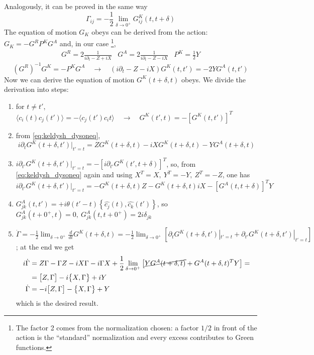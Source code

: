\documentclass[a4paper,11pt]{article}
\theoremstyle{remark}
\newcommand{\mean}[1]{\ensuremath{\langle #1 \rangle}}
\newcommand{\ra}{\rightarrow}
\newcommand{\nl}{\vskip 0.3cm}
\begin{document}
  Analogously, it can be proved in the same way
  \begin{equation*}
   \Gamma_{ij}=-\frac{1}{2}\lim_{\delta\to0^+}G^K_{ij}(t,t+\delta)
  \end{equation*}
  \nl
  The equation of motion $G_K$ obeys can be derived from the action: $G_K=-G^RP^KG^A$ and, in our case \footnote{The factor 2 comes from the normalization chosen: a factor $1/2$ in front of the action is the ``standard'' normalization and every excess contributes to Green functions. },
  \begin{equation*}
   \begin{array}{ccc}
    G^R=2\frac{1}{i\partial_t-Z+iX} & G^A=2\frac{1}{i\partial_t-Z-iX} & P^K=\frac{1}{2}Y
   \end{array}
   \end{equation*}
  \begin{equation}
   (G^R)^{-1}G^K = -P^KG^A \quad\ra\quad (i\partial_t -Z -iX)G^K(t,t')=-2YG^A(t,t') \label{eq:keldysh_dysoneq}
  \end{equation}
  Now we can derive the equation of motion $G^K(t+\delta,t)$ obeys. We divide the derivation into steps: 
  \begin{enumerate}
   \item for $t\neq t'$, $\mean{c_i(t)c_j(t')}=-\mean{c_j(t')c_i{t}} \quad \ra \quad G^K(t',t)=-[G^K(t,t')]^T$
   \item from \eqref{eq:keldysh_dysoneq}, $$\displaystyle i\partial_tG^K(t+\delta,t')|_{t'=t} = ZG^K(t+\delta,t) -iXG^K(t+\delta,t)-YG^A(t+\delta,t)$$
   \item $\displaystyle i\partial_{t'}G^K(t+\delta,t')|_{t'=t} = -\left[i\partial_{t'}G^K(t',t+\delta)\right]^T$, so, from \eqref{eq:keldysh_dysoneq} again and using $\displaystyle X^T=X,\ Y^T=-Y,\ Z^T=-Z$, one has $$\displaystyle i\partial_{t'}G^K(t+\delta,t')|_{t'=t} = - G^K(t+\delta,t)Z - G^K(t+\delta,t)iX-\left[G^A(t,t+\delta)\right]^TY$$
   \item $\displaystyle G^A_{jk}(t,t')=+i\theta(t'-t)\left\{\hat{c_j}(t),\hat{c_k}(t')\right\}$, so $\displaystyle G^A_{jk}(t+0^+,t)=0,\ G^A_{jk}(t,t+0^+)=2i\delta_{jk}$
   \item $\displaystyle\dot{\Gamma}=-\frac{1}{2}\lim_{\delta\to0^+}\frac{d}{dt}G^K(t+\delta,t)=-\frac{1}{2}\lim_{\delta\to0^+}\left[\partial_tG^K(t+\delta,t')|_{t'=t}+\partial_{t'}G^K(t+\delta,t')|_{t'=t}\right]$; at the end we get
   \begin{align*}
    i\dot{\Gamma} &= Z\Gamma - \Gamma Z - iX\Gamma -i\Gamma X +\frac{1}{2}\lim_{\delta\to 0^+}\left[\cancel{YG^A(t+\delta,t)}+ G^A(t+\delta,t)^TY\right] = \\
    &= \big[Z,\Gamma\big] -i\big\{X,\Gamma\big\} +iY \\
    \dot{\Gamma} &= -i\big[Z,\Gamma\big] -\big\{X,\Gamma\big\} +Y
   \end{align*}
   which is the desired result.
  \end{enumerate}
 \pagebreak
\end{document}
